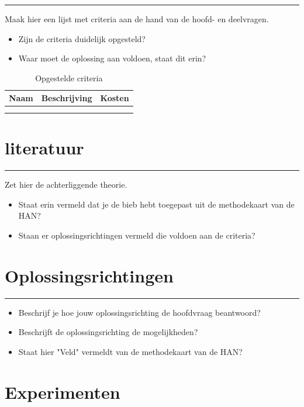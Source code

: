 \documentclass[a4paper, 11pt, oneside]{report}
\begin{document}
\hrule
Maak hier een lijst met criteria aan de hand van de hoofd- en deelvragen.
\begin{itemize}
	
\item Zijn de criteria duidelijk opgesteld?
\item Waar moet de oplossing aan voldoen, staat dit erin?
\end{itemize}

\begin{table}[H]
	\centering
	\begin{tabular}{|l|l|l|}
		\hline
		\rowcolor[HTML]{C0C0C0} 
		Naam & Beschrijving & Kosten \\ \hline
		&              &        \\ \hline
		&              &        \\ \hline
	\end{tabular}
	\caption{Opgestelde criteria}
	\label{tab:criteria}
\end{table}

\chapter{literatuur}

\hrule
Zet hier de achterliggende theorie.
\begin{itemize}
\item Staat erin vermeld dat je de bieb hebt toegepast uit de methodekaart van de HAN?
\item Staan er oplossingsrichtingen vermeld die voldoen aan de criteria?
\end{itemize}


\chapter{Oplossingsrichtingen}

\hrule
\begin{itemize}
\item Beschrijf je hoe jouw oplossingsrichting de hoofdvraag beantwoord?
\item Beschrijft de oplossingsrichting de mogelijkheden?
\item Staat hier "Veld" vermeldt van de methodekaart van de HAN?
\end{itemize}

\chapter{Experimenten}
\end{document}
